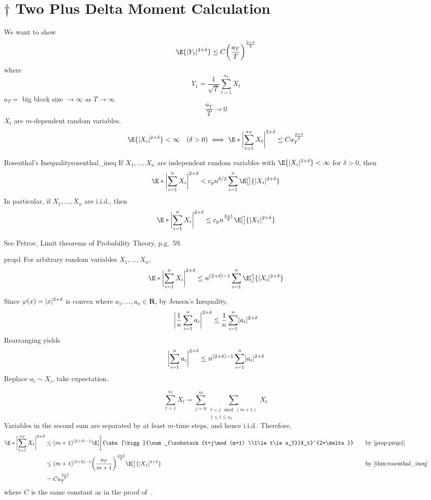 \section{\texorpdfstring{$ \dagger $}{†} Two Plus Delta Moment Calculation}
We want to show
\[ \E{\abs{Y_1}^{2+\delta}}\le C\biggl(\frac{a_T}{T} \biggr)^{\frac{2+\delta}{2}} \]
where
\[ Y_1=\frac{1}{\sqrt{T}} \sum_{t=1}^{a_T} X_t \]
$ a_T= $ big block size $ \to\infty $ as $ T\to\infty $
\[ \frac{a_T}{T} \to 0 \]
$ X_t $ are $ m $-dependent random variables.
\[ \E{\abs{X_i}^{2+\delta}}<\infty\quad(\delta>0)\iff
    \E*{\abs[\bigg]{\sum_{t=1}^{a_T} X_t}^{2+\delta}}\le C a_T^{\frac{2+\delta}{2}} \]
\begin{Theorem}{Rosenthal's Inequality}{rosenthal_ineq}
    If $ X_1,\ldots,X_n $ are independent random variables
    with $ \E{\abs{X_i}^{2+\delta}}<\infty $ for $ \delta>0 $, then
    \[ \E*{\abs[\bigg]{\sum_{i=1}^{n} X_i}^{2+\delta}}<c_p n^{\delta/2}\sum_{i=1}^{n}
        \E[\big]{\abs{X_i}^{2+\delta}} \]
    In particular, if $ X_1,\ldots,X_n $ are i.i.d., then
    \[ \E*{\abs[\bigg]{\sum_{i=1}^{n} X_i}^{2+\delta}}\le c_p n^{\frac{2+\delta}{2}}
        \E[\big]{\abs{X_1}^{2+\delta}} \]
\end{Theorem}
\begin{Proof}{}{}
    See Petrov, Limit theorems of Probability Theory, p.g.\ 59.
\end{Proof}
\begin{Proposition}{}{prop1}
    For arbitrary random variables $ X_1,\ldots,X_n $,
    \[ \E*{\abs[\bigg]{\sum_{i=1}^{n} X_i}^{2+\delta}}\le n^{(2+\delta)-1}
        \sum_{i=1}^{n}\E[\big]{\abs{X_i}^{2+\delta}} \]
\end{Proposition}
\begin{Proof}{}{}
    Since $ \varphi(x)=\abs{x}^{2+\delta} $ is convex where $ a_1,\ldots,a_n\in\mathbf{R} $,
    by Jensen's Inequality,
    \[ \abs[\bigg]{\frac{1}{n} \sum_{i=1}^{n} a_i}^{2+\delta}\le \frac{1}{n} \sum_{i=1}^{n} \abs{a_i}^{2+\delta} \]
    Rearranging yields
    \[ \abs[\bigg]{\sum_{i=1}^{n} a_i}^{2+\delta}\le
        n^{(2+\delta)-1}\sum_{i=1}^{n} \abs{a_i}^{2+\delta} \]
    Replace $ a_i\sim X_i $, take expectation.
\end{Proof}
\[ \sum_{t=1}^{a_T} X_t=\sum_{j=0}^{m}
    \sum_{\substack{t=j\mod (m+1)\\1\le t\le a_T}}X_t  \]
Variables in the second sum are separated by at least
$ m $-time steps, and hence i.i.d.\ Therefore,
\begin{align*}
    \E*{\abs[\bigg]{\sum_{t=1}^{a_T} X_t}^{2+\delta}}
     & \le (m+1)^{(2+\delta)-1}
    \E[\bigg]{\abs[\bigg]{\sum_{\substack{t=j\mod (m+1)                                                                                                    \\1\le t\le a_T}}X_t}^{2+\delta}} & \quad & \text{by~\Cref{prop:prop1}}\\
     & \le (m+1)^{(2+\delta)-1}\biggl(\frac{a_T}{m+1} \biggr)^{\frac{2+\delta}{2} }\E[\big]{\abs{X_1}^{2+\delta}} &  & \text{by~\Cref{thm:rosenthal_ineq}} \\
     & =C a_T^{\frac{2+\delta}{2}}
\end{align*}
where $ C $ is the same constant as in the proof of~.

